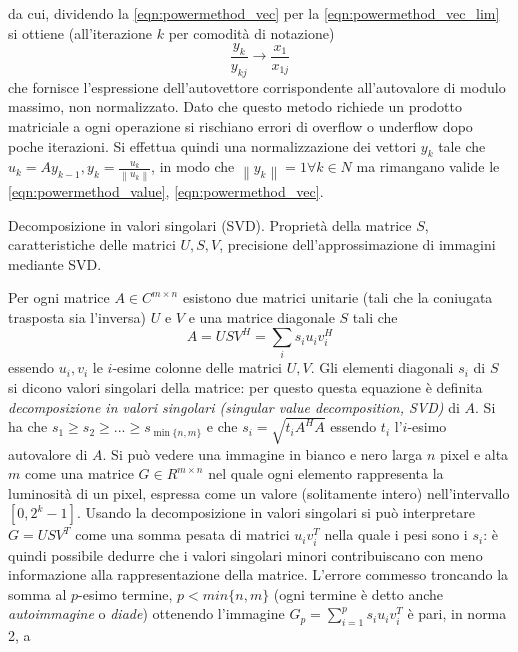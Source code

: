 \documentclass[answers, a4paper]{exam}
\newcommand{\norm}[1]{\left\lVert#1\right\rVert}
\begin{document}
\begin{questions}
\begin{solution}
		 da cui, dividendo la \cref{eqn:powermethod_vec}  per la \cref{eqn:powermethod_vec_lim}  si ottiene (all'iterazione $k$ per comodità di notazione)
		\begin{equation}
			\label{eqn:powermethod_vec_final}
			\frac{y_{k}}{y_{kj}} \longrightarrow \frac{x_1}{x_{1j}}
		\end{equation}
		che fornisce l'espressione dell'autovettore corrispondente all'autovalore di modulo massimo, non normalizzato. 
		Dato che questo metodo richiede un prodotto matriciale a ogni operazione si rischiano errori di overflow o underflow dopo poche iterazioni. 
		Si effettua quindi una normalizzazione dei vettori $y_k$ tale che $u_k = Ay_{k - 1}, y_k = \frac{u_k}{\norm{u_k}}$, in modo che $\norm{y_k} = 1 \forall k \in N$ ma rimangano valide le \cref{eqn:powermethod_value}, \cref{eqn:powermethod_vec}.
	\end{solution}
	\question Decomposizione in valori singolari (SVD). Proprietà della matrice $S$, caratteristiche delle matrici $U, S, V$, precisione dell'approssimazione di immagini mediante SVD.
	\begin{solution}
	Per ogni matrice $A \in C^{m \times n}$ esistono due matrici unitarie (tali che la coniugata trasposta sia l'inversa) $U$ e $V$ e una matrice diagonale $S$ tali che 
\begin{equation}
	\label{svd}
	A = U S V^H = \sum_i s_i u_i v_i^H
\end{equation} essendo $u_i, v_i$ le $i$-esime colonne delle matrici $U, V$. 
		Gli elementi diagonali $s_i$ di $S$ si dicono valori singolari della matrice: per questo questa equazione è definita \textit{decomposizione in  valori singolari (singular value decomposition, SVD)} di $A$. 
		Si ha che $s_1 \geq s_2 \geq ... \geq s_{\min\{n, m\}}$ e che $s_i = \sqrt{t_i A^H A}$ essendo $t_i$ l'$i$-esimo autovalore di $A$. 
		Si può vedere una immagine in bianco e nero larga $n$ pixel e alta $m$ come una matrice $G \in R^{m \times n}$ nel quale ogni elemento rappresenta la luminosità di un pixel, espressa come un valore (solitamente intero) nell'intervallo $[0, 2^k - 1]$. 
		Usando la decomposizione in valori singolari si può interpretare $G = U S V^T$ come una somma pesata di matrici $u_i v_i^T$ nella quale i pesi sono i  $s_i$: è quindi possibile dedurre che i valori singolari minori contribuiscano con meno informazione alla rappresentazione della matrice. 
		L'errore commesso troncando la somma al $p$-esimo termine, $p < min\{n, m\}$ (ogni termine è detto anche \textit{autoimmagine} o \textit{diade}) ottenendo l'immagine $G_p = \sum_{i = 1}^p s_i u_i v_i^T$ è pari, in norma 2, a

\end{solution}
\end{questions}
\end{document}
